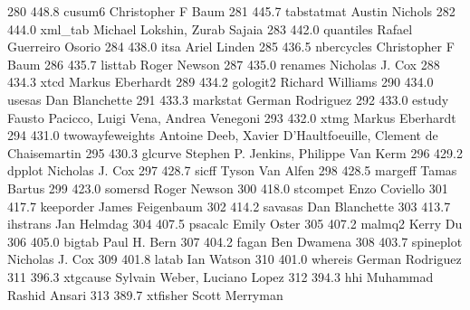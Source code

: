    280    448.8    cusum6        Christopher F Baum                      
   281    445.7    tabstatmat    Austin Nichols                          
   282    444.0    xml_tab       Michael Lokshin, Zurab Sajaia           
   283    442.0    quantiles     Rafael Guerreiro Osorio                 
   284    438.0    itsa          Ariel Linden                            
   285    436.5    nbercycles    Christopher F Baum                      
   286    435.7    listtab       Roger Newson                            
   287    435.0    renames       Nicholas J. Cox                         
   288    434.3    xtcd          Markus Eberhardt                        
   289    434.2    gologit2      Richard Williams                        
   290    434.0    usesas        Dan Blanchette                          
   291    433.3    markstat      German Rodriguez                        
   292    433.0    estudy        Fausto Pacicco, Luigi Vena, Andrea      
                                   Venegoni                                
   293    432.0    xtmg          Markus Eberhardt                        
   294    431.0    twowayfeweights  Antoine Deeb, Xavier D'Haultfoeuille,   
                                   Clement de Chaisemartin                 
   295    430.3    glcurve       Stephen P. Jenkins, Philippe Van Kerm   
   296    429.2    dpplot        Nicholas J. Cox                         
   297    428.7    sicff         Tyson Van Alfen                         
   298    428.5    margeff       Tamas Bartus                            
   299    423.0    somersd       Roger Newson                            
   300    418.0    stcompet      Enzo Coviello                           
   301    417.7    keeporder     James Feigenbaum                        
   302    414.2    savasas       Dan Blanchette                          
   303    413.7    ihstrans      Jan Helmdag                             
   304    407.5    psacalc       Emily Oster                             
   305    407.2    malmq2        Kerry Du                                
   306    405.0    bigtab        Paul H. Bern                            
   307    404.2    fagan         Ben Dwamena                             
   308    403.7    spineplot     Nicholas J. Cox                         
   309    401.8    latab         Ian Watson                              
   310    401.0    whereis       German Rodriguez                        
   311    396.3    xtgcause      Sylvain Weber, Luciano Lopez            
   312    394.3    hhi           Muhammad Rashid Ansari                  
   313    389.7    xtfisher      Scott Merryman                          
